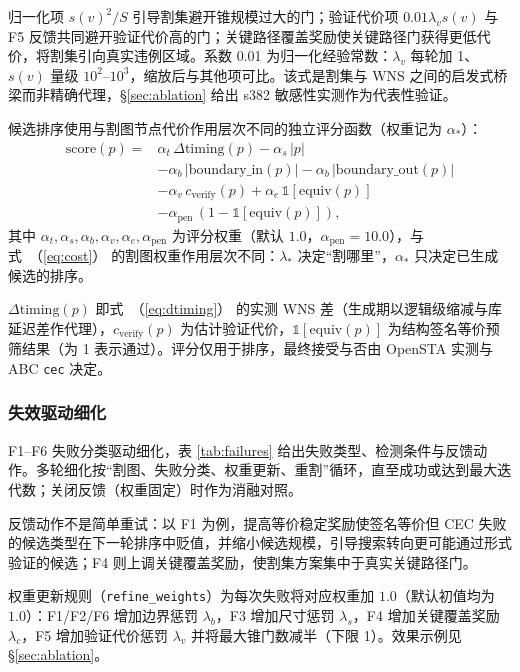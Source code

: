 \documentclass[journal]{IEEEtran}
\renewcommand{\eqref}[1]{\textup{（\ref{#1}）}}
\begin{document}
归一化项 $s(v)^2/S$ 引导割集避开锥规模过大的门；验证代价项 $0.01\lambda_v s(v)$ 与 F5 反馈共同避开验证代价高的门；关键路径覆盖奖励使关键路径门获得更低代价，将割集引向真实违例区域。系数 0.01 为归一化经验常数：$\lambda_v$ 每轮加 1、$s(v)$ 量级 $10^2$--$10^3$，缩放后与其他项可比。该式是割集与 WNS 之间的启发式桥梁而非精确代理，\S\ref{sec:ablation} 给出 s382 敏感性实测作为代表性验证。

候选排序使用与割图节点代价作用层次不同的独立评分函数（权重记为 $\alpha_*$）：
{\small
\begin{equation}\label{eq:score}
\begin{split}
\mathrm{score}(p) = {}&\alpha_t\,\Delta\mathrm{timing}(p) - \alpha_s\,|p| \\
&- \alpha_b\,|\mathrm{boundary\_in}(p)| - \alpha_b\,|\mathrm{boundary\_out}(p)| \\
&- \alpha_v\,c_{\mathrm{verify}}(p) + \alpha_e\,\mathbb{1}[\mathrm{equiv}(p)] \\
&- \alpha_{\mathrm{pen}}\,(1-\mathbb{1}[\mathrm{equiv}(p)]),
\end{split}
\end{equation}
}
其中 $\alpha_t,\alpha_s,\alpha_b,\alpha_v,\alpha_e,\alpha_{\mathrm{pen}}$ 为评分权重（默认 $1.0$，$\alpha_{\mathrm{pen}}=10.0$），与式~\eqref{eq:cost} 的割图权重作用层次不同：$\lambda_*$ 决定“割哪里”，$\alpha_*$ 只决定已生成候选的排序。

$\Delta\mathrm{timing}(p)$ 即式~\eqref{eq:dtiming} 的实测 WNS 差（生成期以逻辑级缩减与库延迟差作代理），$c_{\mathrm{verify}}(p)$ 为估计验证代价，$\mathbb{1}[\mathrm{equiv}(p)]$ 为结构签名等价预筛结果（为 1 表示通过）。评分仅用于排序，最终接受与否由 OpenSTA 实测与 ABC \texttt{cec} 决定。

\subsubsection{失效驱动细化}
F1--F6 失败分类驱动细化，表 \ref{tab:failures} 给出失败类型、检测条件与反馈动作。多轮细化按“割图、失败分类、权重更新、重割”循环，直至成功或达到最大迭代数；关闭反馈（权重固定）时作为消融对照。

反馈动作不是简单重试：以 F1 为例，提高等价稳定奖励使签名等价但 CEC 失败的候选类型在下一轮排序中贬值，并缩小候选规模，引导搜索转向更可能通过形式验证的候选；F4 则上调关键覆盖奖励，使割集方案集中于真实关键路径门。

权重更新规则（\texttt{refine\_weights}）为每次失败将对应权重加 $1.0$（默认初值均为 $1.0$）：F1/F2/F6 增加边界惩罚 $\lambda_b$，F3 增加尺寸惩罚 $\lambda_s$，F4 增加关键覆盖奖励 $\lambda_c$，F5 增加验证代价惩罚 $\lambda_v$ 并将最大锥门数减半（下限 1）。效果示例见 \S\ref{sec:ablation}。
\end{document}
